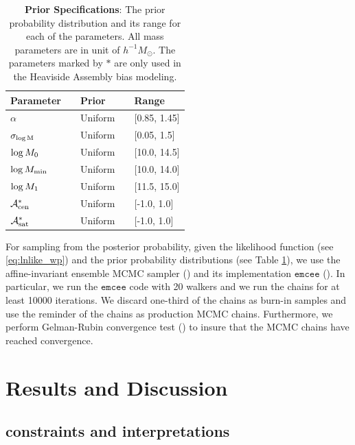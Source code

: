 \begin{table}
\begin{center}
  \label{tab:prior}
  \caption{{\bf Prior Specifications}: The prior probability distribution 
  and its range for each of the parameters. 
  All mass parameters are in unit of $h^{-1}M_\odot$. The parameters marked by $*$ are only used in the Heaviside Assembly bias modeling.}
\begin{tabular}{@{}lllll}
\\ \hline 
    Parameter & & Prior & & Range \\ \hline
  $\alpha$ & & Uniform & & [0.85, 1.45] \\
  $\sigma_{\log \rm M}$ & & Uniform & &  [0.05, 1.5] \\
   $\log M_{0}$   & & Uniform & &  [10.0, 14.5] \\
  $\log M_{\rm min}$ & &   Uniform & &  [10.0, 14.0] \\
  $\log M_{1}$ & & Uniform & & [11.5, 15.0] \\ 
  $\mathcal{A}_{\rm cen}^{*}$ & & Uniform & & [-1.0, 1.0] \\
  $\mathcal{A}_{\rm sat}^{*}$ & & Uniform & & [-1.0, 1.0] \\
 \hline
  \end{tabular}
\end{center}
\end{table}

For sampling from the posterior probability, given the likelihood function (see \ref{eq:lnlike_wp}) and the prior probability distributions (see Table \ref{tab:prior}), we use the affine-invariant ensemble MCMC sampler (\citealt{goodmanweare}) and its implementation $\mathtt{emcee}$ (\citealt{emcee}). In particular, we run the $\mathtt{emcee}$ code with 20 walkers and we run the chains for at least 10000 iterations. We discard one-third of the chains as burn-in samples and use the reminder of the chains as production MCMC chains. Furthermore, we perform Gelman-Rubin convergence test (\citealt{grtest}) to insure that the MCMC chains have reached convergence.


\section{Results and Discussion}\label{sec:result}

\subsection{constraints and interpretations}

